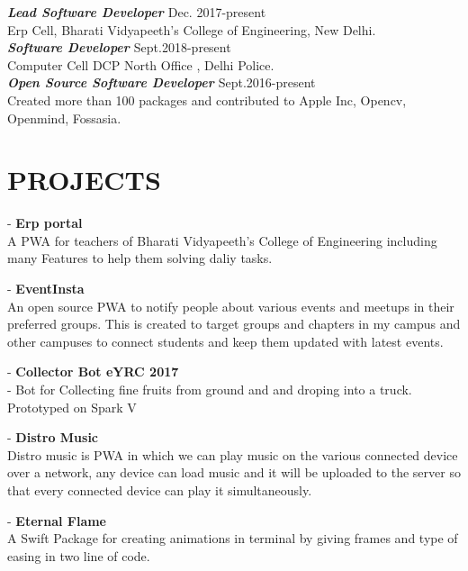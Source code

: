 \documentclass[margin, 10pt]{res}
\begin{document}
\begin{resume}
    {\sl {\bf Lead Software Developer }}\hfill Dec. 2017-present \\
    Erp Cell, Bharati Vidyapeeth's College of Engineering, New Delhi.\\
    {\sl {\bf Software Developer }}\hfill Sept.2018-present \\
    Computer Cell DCP North Office , Delhi Police.\\
    {\sl {\bf Open Source Software Developer }}\hfill Sept.2016-present \\
    Created more than 100 packages and contributed to Apple Inc, Opencv, Openmind, Fossasia.\\
  
    
    
    \section{PROJECTS}
    - {\bf Erp portal }\\
    A PWA for teachers of Bharati Vidyapeeth's College of Engineering including many Features to help them solving daliy tasks.
    
    - {\bf EventInsta }\\
    An open source PWA to notify people about various events and meetups in their preferred groups. This is created to target groups and chapters in my campus and other campuses to connect students and keep them updated with latest events.  
    
   
    - {\bf Collector Bot eYRC 2017} \\
    - Bot for Collecting  fine fruits from ground and and droping into a truck. Prototyped on Spark V 
    
    - {\bf Distro Music} \\ Distro music is PWA in which we can play music on the various connected device over a network, any device can load music and it will be uploaded to the server so that  every connected device can play it simultaneously. 
    
    - {\bf Eternal Flame}\\
    A Swift Package for creating animations in terminal by giving frames and type of easing in two line of code.
    

\end{resume}
\end{document}
